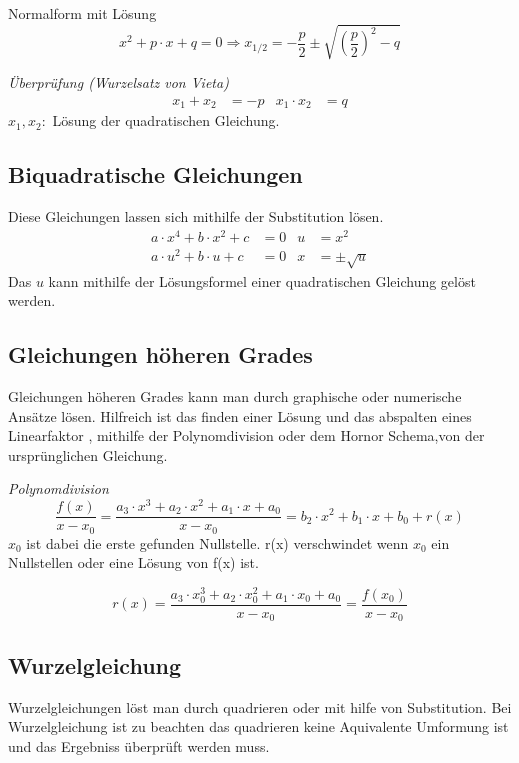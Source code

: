  Normalform mit Lösung
 \begin{equation*}
  x^2+p\cdot x+q=0\Rightarrow x_{1/2}=-\frac{p}{2}\pm\sqrt{\left(\frac{p}{2}\right)^2-q}
 \end{equation*}

\emph{Überprüfung (Wurzelsatz von Vieta)}
 \begin{align*}
  x_1+x_2&=-p& x_1\cdot x_2&=q 
 \end{align*}
$x_1, x_2:$ Lösung der quadratischen Gleichung.

\subsection{Biquadratische Gleichungen}
Diese Gleichungen lassen sich mithilfe der Substitution lösen.
 \begin{align*}
  a\cdot x^4+b\cdot x^2 +c&=0&u&=x^2 \\
  a\cdot u^2+b\cdot u +c&=0&x&=\pm\sqrt{u}
 \end{align*}
Das $u$ kann mithilfe der Lösungsformel einer quadratischen Gleichung gelöst werden.

\subsection{Gleichungen höheren Grades} 
Gleichungen höheren Grades kann man durch graphische oder numerische Ansätze lösen. Hilfreich ist das finden einer Lösung und das abspalten eines Linearfaktor
, mithilfe der Polynomdivision oder dem Hornor Schema,von der ursprünglichen Gleichung.

\emph{Polynomdivision}
 \begin{equation*}
  \frac{f(x)}{x-x_0}=\frac{a_3\cdot x^3+a_2\cdot x^2+a_1\cdot x +a_0}{x-x_0}=b_2\cdot x^2+b_1 \cdot x+b_0+r(x)
 \end{equation*}
$x_0$ ist dabei die erste gefunden Nullstelle. r(x) verschwindet wenn $x_0$ ein Nullstellen oder eine Lösung von f(x) ist.

 \begin{equation*}
  r(x)=\frac{a_3\cdot x_0^3+a_2\cdot x_0^2+a_1\cdot x_0 +a_0}{x-x_0}=\frac{f(x_0)}{x-x_0}
 \end{equation*}

\subsection{Wurzelgleichung}
Wurzelgleichungen löst man durch quadrieren oder mit hilfe von Substitution.
Bei Wurzelgleichung ist zu beachten das quadrieren keine Aquivalente Umformung ist und das 
Ergebniss überprüft werden muss.

